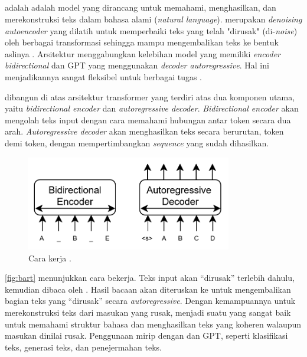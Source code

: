 \subsection{\bartfull}
\label{subsec:bart}

\bartfull adalah adalah model \ml{} yang dirancang untuk memahami, menghasilkan, dan merekonstruksi teks dalam bahasa alami (\emph{natural language}). \bart{} merupakan \emph{denoising autoencoder} yang dilatih untuk memperbaiki teks yang telah "dirusak" (di-\emph{noise}) oleh berbagai transformasi sehingga mampu mengembalikan teks ke bentuk aslinya \parencite{lewis2019bart}. Arsitektur \bart{} menggabungkan kelebihan model \bert{} yang memiliki \emph{encoder bidirectional} dan GPT yang menggunakan \emph{decoder autoregressive}. Hal ini menjadikannya sangat fleksibel untuk berbagai tugas \nlpfull.

\bart{} dibangun di atas arsitektur transformer yang terdiri atas dua 
komponen utama, yaitu \emph{bidirectional encoder} dan \textit{autoregressive decoder}. 
\emph{Bidirectional encoder} akan mengolah teks input dengan cara memahami hubungan antar token secara dua arah. \emph{Autoregressive decoder} akan menghasilkan teks secara berurutan, token demi token, dengan mempertimbangkan \emph{sequence} yang sudah dihasilkan.

\begin{figure}
\centering
\includegraphics[width=0.8\textwidth]{images/bart.png}
\caption{Cara kerja \bart{} \parencite{lewis2019bart}.}
\label{fig:bart}
\end{figure}

\autoref{fig:bart} menunjukkan cara \bart{} bekerja. Teks input akan “dirusak” terlebih dahulu, kemudian dibaca oleh \encoder. Hasil bacaan \encoder{} akan diteruskan ke \decoder{} untuk mengembalikan bagian teks yang “dirusak” secara 
\textit{autoregressive}. Dengan kemampuannya untuk merekonstruksi teks dari masukan yang rusak, \bart{} menjadi suatu \transformer{} yang sangat baik untuk memahami struktur bahasa dan menghasilkan teks yang koheren walaupun masukan dinilai 
rusak. Penggunaan \bart{} mirip dengan \bert{} dan GPT, seperti klasifikasi teks, generasi teks, dan penejermahan teks. 



